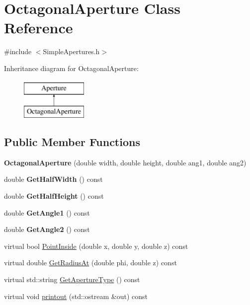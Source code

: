 \hypertarget{classOctagonalAperture}{}\section{Octagonal\+Aperture Class Reference}
\label{classOctagonalAperture}


{\ttfamily \#include $<$Simple\+Apertures.\+h$>$}

Inheritance diagram for Octagonal\+Aperture\+:\begin{figure}[H]
\begin{center}
\leavevmode
\includegraphics[height=2.000000cm]{classOctagonalAperture}
\end{center}
\end{figure}
\subsection*{Public Member Functions}
\begin{DoxyCompactItemize}
\item 
\mbox{\label{classOctagonalAperture_adb79bb0889670382a40c81f60be0f9ac}} 
{\bfseries Octagonal\+Aperture} (double width, double height, double ang1, double ang2)
\item 
\mbox{\label{classOctagonalAperture_af44098a71aec44b260fbafd32eef4f5d}} 
double {\bfseries Get\+Half\+Width} () const
\item 
\mbox{\label{classOctagonalAperture_a9bdac57db6e28494fda9ed9473cdb53d}} 
double {\bfseries Get\+Half\+Height} () const
\item 
\mbox{\label{classOctagonalAperture_acf26d6dc0318e69a5d1034d6dbe3fbc0}} 
double {\bfseries Get\+Angle1} () const
\item 
\mbox{\label{classOctagonalAperture_a51cea43c4b298526e9f56310380355f9}} 
double {\bfseries Get\+Angle2} () const
\item 
virtual bool \hyperlink{classOctagonalAperture_a9c3e4ba8a96d3b97fc92fdeef975caf9}{Point\+Inside} (double x, double y, double z) const
\item 
virtual double \hyperlink{classOctagonalAperture_ab79ca14c1d75522637bea3ffbbb0d8a4}{Get\+Radius\+At} (double phi, double z) const
\item 
virtual std\+::string \hyperlink{classOctagonalAperture_ada756a63c21912b26d79a5743bbd051f}{Get\+Aperture\+Type} () const
\item 
virtual void \hyperlink{classOctagonalAperture_ad8329324a912bc76c97fd3f8bbefa5ac}{printout} (std\+::ostream \&out) const
\end{DoxyCompactItemize}
